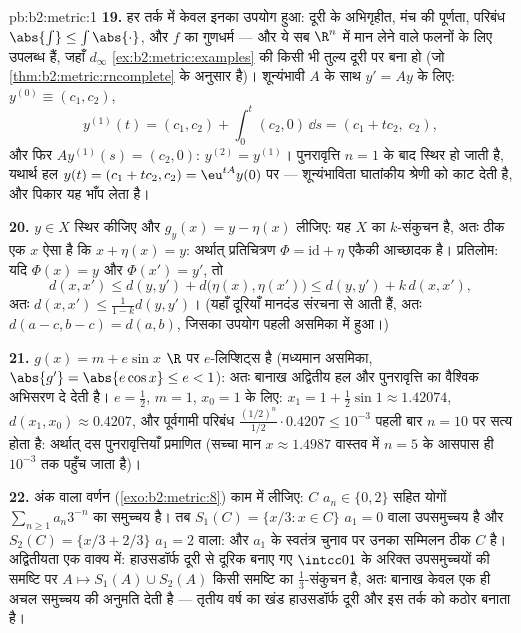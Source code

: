 \begin{solution}{pb:b2:metric:1}
\textbf{19.} हर तर्क में केवल इनका उपयोग हुआ: दूरी के अभिगृहीत, मंच की
पूर्णता, परिबंध $\abs{\int} \leq
\int\abs{\cdot}$, और $f$ का  गुणधर्म --- और ये सब $\R^n$ में
मान लेने वाले फलनों के लिए उपलब्ध हैं, जहाँ $d_\infty$ \cref{ex:b2:metric:examples} की किसी भी तुल्य
दूरी पर बना हो (जो \cref{thm:b2:metric:rncomplete} के अनुसार  है)। शून्यंभावी $A$ के साथ $y' = Ay$
के लिए: $y^{(0)} \equiv (c_1, c_2)$,
\[
y^{(1)}(t) = (c_1, c_2) + \int_0^t (c_2, 0)\,\dd s
= (c_1 + tc_2,\; c_2),
\]
और फिर $Ay^{(1)}(s) = (c_2, 0)$: $y^{(2)} = y^{(1)}$। पुनरावृत्ति $n = 1$ के बाद स्थिर हो जाती है, यथार्थ हल
$y(t) = (c_1 + tc_2, c_2) = \eu^{tA}y(0)$ पर --- शून्यंभाविता घातांकीय श्रेणी को काट देती है, और पिकार यह
भाँप लेता है।

\textbf{20.} $y \in X$ स्थिर कीजिए और $g_y(x) = y - \eta(x)$ लीजिए: यह  $X$ का
$k$-संकुचन है, अतः ठीक एक $x$ ऐसा है कि $x + \eta(x) = y$: अर्थात् प्रतिचित्रण $\Phi = \mathrm{id} + \eta$
एकैकी आच्छादक है।  प्रतिलोम: यदि $\Phi(x) = y$ और $\Phi(x') =
y'$, तो
\[
d(x, x') \leq d(y, y') + d\bigl(\eta(x), \eta(x')\bigr)
\leq d(y, y') + k\,d(x, x'),
\]
अतः $d(x, x') \leq \frac{1}{1-k}d(y, y')$। (यहाँ दूरियाँ मानदंड संरचना से आती हैं, अतः $d(a - c, b - c) = d(a, b)$, जिसका
उपयोग पहली असमिका में हुआ।)

\textbf{21.} $g(x) = m + e\sin x$  $\R$ पर $e$-लिप्शिट्स है (मध्यमान असमिका, $\abs{g'} = \abs{e\cos x}
\leq e < 1$):
अतः बानाख अद्वितीय हल और पुनरावृत्ति का वैश्विक अभिसरण दे देती है।
$e = \frac12$, $m = 1$, $x_0
= 1$ के लिए: $x_1 = 1 + \frac12\sin 1 \approx 1.42074$, $d(x_1, x_0)
\approx 0.4207$, और पूर्वगामी परिबंध $\frac{(1/2)^n}{1/2}\cdot 0.4207 \leq 10^{-3}$ पहली बार $n = 10$
पर सत्य होता है: अर्थात् दस पुनरावृत्तियाँ प्रमाणित (सच्चा मान $x \approx
1.4987$
वास्तव में $n =
5$ के आसपास ही $10^{-3}$ तक पहुँच जाता है)।

\textbf{22.} अंक वाला वर्णन (\cref{exo:b2:metric:8}) काम में लीजिए: $C$ $a_n \in \{0, 2\}$ सहित योगों
$\sum_{n\geq1}a_n3^{-n}$ का समुच्चय है। तब $S_1(C) =
\{x/3 : x \in C\}$ $a_1 = 0$ वाला उपसमुच्चय है और $S_2(C) =
\{x/3 + 2/3\}$ $a_1 = 2$ वाला: और
$a_1$ के स्वतंत्र चुनाव पर उनका सम्मिलन ठीक $C$ है। अद्वितीयता एक वाक्य
में: हाउसडॉर्फ दूरी से दूरिक बनाए गए $\intcc01$ के अरिक्त  उपसमुच्चयों की
समष्टि पर $A \mapsto
S_1(A) \cup S_2(A)$ किसी  समष्टि का $\frac13$-संकुचन है, अतः बानाख केवल एक
ही अचल समुच्चय की अनुमति देती है --- तृतीय वर्ष का खंड हाउसडॉर्फ दूरी
और इस तर्क को कठोर बनाता है।


\end{solution}
